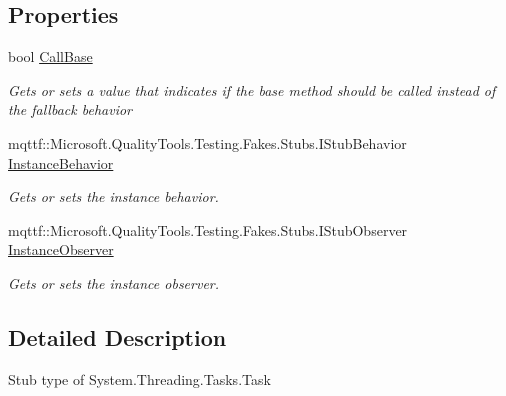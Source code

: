 \subsection*{Properties}
\begin{DoxyCompactItemize}
\item 
bool \hyperlink{class_system_1_1_threading_1_1_tasks_1_1_fakes_1_1_stub_task_aeaaf2e7b991b19ead6057f98258ace1c}{Call\-Base}
\begin{DoxyCompactList}\small\item\em Gets or sets a value that indicates if the base method should be called instead of the fallback behavior\end{DoxyCompactList}\item 
mqttf\-::\-Microsoft.\-Quality\-Tools.\-Testing.\-Fakes.\-Stubs.\-I\-Stub\-Behavior \hyperlink{class_system_1_1_threading_1_1_tasks_1_1_fakes_1_1_stub_task_a7b97ae908073f7f9f8201acd2b9972e2}{Instance\-Behavior}
\begin{DoxyCompactList}\small\item\em Gets or sets the instance behavior.\end{DoxyCompactList}\item 
mqttf\-::\-Microsoft.\-Quality\-Tools.\-Testing.\-Fakes.\-Stubs.\-I\-Stub\-Observer \hyperlink{class_system_1_1_threading_1_1_tasks_1_1_fakes_1_1_stub_task_a8c52c018bedda2a77f157f263680cdd2}{Instance\-Observer}
\begin{DoxyCompactList}\small\item\em Gets or sets the instance observer.\end{DoxyCompactList}\end{DoxyCompactItemize}


\subsection{Detailed Description}
Stub type of System.\-Threading.\-Tasks.\-Task



